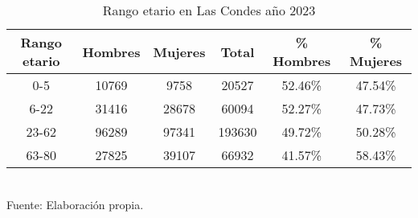 \documentclass[12pt]{article} %
\begin{document}
\begin{table}[H]
    \centering
    \caption{Rango etario en Las Condes año 2023}
    \vspace{0.2cm}
    \begin{tabular}{|c|c|c|c|c|c|}
        \hline
        \textbf{Rango etario} & \textbf{Hombres} & \textbf{Mujeres} & \textbf{Total} & \textbf{\% Hombres} & \textbf{\% Mujeres} \\ \hline
        0-5 & 10769 & 9758 & 20527 & 52.46\% & 47.54\% \\ \hline
        6-22 & 31416 & 28678 & 60094 & 52.27\% & 47.73\% \\ \hline
        23-62 & 96289 & 97341 & 193630 & 49.72\% & 50.28\% \\ \hline
        63-80 & 27825 & 39107 & 66932 & 41.57\% & 58.43\% \\ \hline
    \end{tabular}
    \label{Cuadro 6}
    \vspace{0.2cm}
    \\Fuente: Elaboración propia.
\end{table}

\end{document}
